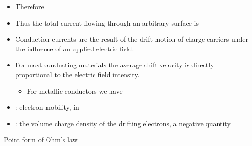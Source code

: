 \begin{ELjoin}

\begin{itemize}
\tightlist
\item
  Therefore
\end{itemize}


\begin{itemize}
\tightlist
\item
  Thus the total current flowing through an arbitrary surface  is
\end{itemize}

\begin{ELimportant}{}


\end{ELimportant}

\end{ELjoin}

\begin{ELunit}

\begin{itemize}
\tightlist
\item
  Conduction currents are the result of the drift motion of charge carriers under the influence of an applied electric field.
\item
  For most conducting materials the average drift velocity is directly proportional to the electric field intensity.

  \begin{itemize}
  \tightlist
  \item
    For metallic conductors we have
  \end{itemize}
\end{itemize}


\begin{itemize}
\tightlist
\item
  : electron mobility, in 
\end{itemize}


\end{ELunit}

\begin{ELjoin}

\begin{itemize}
\tightlist
\item
  : the volume charge density of the drifting electrons, a negative quantity
\end{itemize}

\begin{ELimportant}{Point form of Ohm's law}


\end{ELimportant}

\end{ELjoin}

